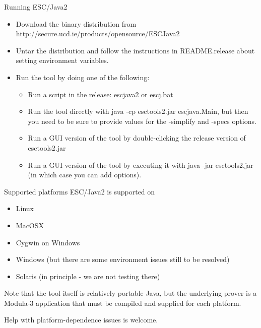 \documentclass[
pdf,
nocolorBG,
slideColor,
cok,
]{prosper}
\begin{document}
\begin{slide}{Running ESC/Java2}
\vspace*{-6ex}
\begin{itemize}
\item Download the binary distribution from {\green http://secure.ucd.ie/products/opensource/ESCJava2}
\item Untar the distribution and follow the instructions in {\green README.release} about setting environment variables.
\item Run the tool by doing one of the following:
\begin{itemize}
\item Run a script in the release: {\green escjava2} or {\green escj.bat}
\item Run the tool directly with {\green java -cp esctools2.jar escjava.Main}, but then you need to be sure to provide values for the {\blue -simplify} and {\blue -specs}  options.
\item Run a GUI version of the tool by double-clicking the release version of {\green esctools2.jar}
\item Run a GUI version of the tool by executing it with {\green java -jar esctools2.jar} (in which case you can add options).
\end{itemize}
\end{itemize}
\end{slide}


\begin{slide}{Supported platforms}
\vspace*{-6ex}
ESC/Java2 is supported on
\begin{itemize}
\item Linux
\item MacOSX
\item Cygwin on Windows
\item Windows (but there are some environment issues still to be resolved)
\item Solaris (in principle - we are not testing there)
\end{itemize}
Note that the tool itself is relatively portable Java, but the underlying prover is a Modula-3 application that must be compiled and supplied for each platform.

Help with platform-dependence issues is welcome.
\end{slide}

\end{document}
